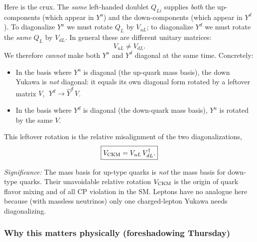Here is the crux. The \emph{same} left-handed doublet $Q_{Li}$ supplies
\emph{both} the up-components (which appear in $Y^u$) and the
down-components (which appear in $Y^d$). To diagonalize $Y^u$ we must
rotate $Q_L$ by $V_{uL}$; to diagonalize $Y^d$ we must rotate the
\emph{same} $Q_L$ by $V_{dL}$. In general these are different unitary
matrices:
\begin{equation}
  \boxed{V_{uL}\neq V_{dL}.}
  \label{eq:lec20:vneq}
\end{equation}
We therefore \emph{cannot} make both $Y^u$ and $Y^d$ diagonal at the
same time. Concretely:
\begin{itemize}
  \item In the basis where $Y^u$ is diagonal (the up-quark mass basis),
        the down Yukawa is \emph{not} diagonal: it equals its own
        diagonal form rotated by a leftover matrix $V$,
        $\;Y^d \to \hat Y^d\,V$.
  \item In the basis where $Y^d$ is diagonal (the down-quark mass
        basis), $Y^u$ is rotated by the same $V$.
\end{itemize}
This leftover rotation is the relative misalignment of the two
diagonalizations,
\begin{equation}
  \boxed{V_{\rm CKM} = V_{uL}\,V_{dL}^\dagger.}
  \label{eq:lec20:ckm-def}
\end{equation}


\textit{Significance:} The mass basis for up-type quarks is
\emph{not} the mass basis for down-type quarks. Their unavoidable
relative rotation $V_{\rm CKM}$ is the origin of quark flavor mixing
and of all CP violation in the SM. Leptons have no analogue here
because (with massless neutrinos) only one charged-lepton Yukawa needs
diagonalizing.

\subsubsection*{Why this matters physically (foreshadowing Thursday)}

